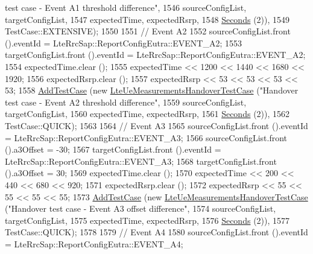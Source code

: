 \begin{DoxyCode}
{       test case - Event A1 threshold difference"},
1546                                                       sourceConfigList, targetConfigList,
1547                                                       expectedTime, expectedRsrp,
1548                                                       \hyperlink{group__timecivil_ga33c34b816f8ff6628e33d5c8e9713b9e}{Seconds} (2)),
1549                TestCase::EXTENSIVE);
1550 
1551   \textcolor{comment}{// Event A2}
1552   sourceConfigList.front ().eventId = LteRrcSap::ReportConfigEutra::EVENT\_A2;
1553   targetConfigList.front ().eventId = LteRrcSap::ReportConfigEutra::EVENT\_A2;
1554   expectedTime.clear ();
1555   expectedTime << 1200 << 1440 << 1680 << 1920;
1556   expectedRsrp.clear ();
1557   expectedRsrp << 53 << 53 << 53 << 53;
1558   \hyperlink{classns3_1_1TestCase_a3718088e3eefd5d6454569d2e0ddd835}{AddTestCase} (\textcolor{keyword}{new} \hyperlink{classLteUeMeasurementsHandoverTestCase}{LteUeMeasurementsHandoverTestCase} (\textcolor{stringliteral}{"Handover
       test case - Event A2 threshold difference"},
1559                                                       sourceConfigList, targetConfigList,
1560                                                       expectedTime, expectedRsrp,
1561                                                       \hyperlink{group__timecivil_ga33c34b816f8ff6628e33d5c8e9713b9e}{Seconds} (2)),
1562                TestCase::QUICK);
1563 
1564   \textcolor{comment}{// Event A3}
1565   sourceConfigList.front ().eventId = LteRrcSap::ReportConfigEutra::EVENT\_A3;
1566   sourceConfigList.front ().a3Offset = -30;
1567   targetConfigList.front ().eventId = LteRrcSap::ReportConfigEutra::EVENT\_A3;
1568   targetConfigList.front ().a3Offset = 30;
1569   expectedTime.clear ();
1570   expectedTime << 200 << 440 << 680 << 920;
1571   expectedRsrp.clear ();
1572   expectedRsrp << 55 << 55 << 55 << 55;
1573   \hyperlink{classns3_1_1TestCase_a3718088e3eefd5d6454569d2e0ddd835}{AddTestCase} (\textcolor{keyword}{new} \hyperlink{classLteUeMeasurementsHandoverTestCase}{LteUeMeasurementsHandoverTestCase} (\textcolor{stringliteral}{"Handover
       test case - Event A3 offset difference"},
1574                                                       sourceConfigList, targetConfigList,
1575                                                       expectedTime, expectedRsrp,
1576                                                       \hyperlink{group__timecivil_ga33c34b816f8ff6628e33d5c8e9713b9e}{Seconds} (2)),
1577                TestCase::QUICK);
1578 
1579   \textcolor{comment}{// Event A4}
1580   sourceConfigList.front ().eventId = LteRrcSap::ReportConfigEutra::EVENT\_A4;

\end{DoxyCode}
